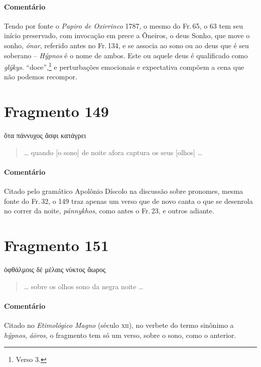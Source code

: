 \medskip

{\paragraph{Comentário} Tendo por fonte o \textit{Papiro de Oxirrinco} 1787, o mesmo do Fr.\,65, o 63 tem seu início preservado, com invocação em prece a Ôneiros, o deus Sonho, que move o sonho, \textit{ónar}, referido antes no Fr.\,134, e se associa ao sono ou ao deus que é seu soberano -- \textit{Hýpnos} é o nome de ambos. Este ou aquele deus é qualificado como \textit{glýkys}. ``doce'',\footnote{Verso 3.} e perturbações emocionais e expectativa compõem a cena que não podemos recompor.}



\pagebreak
\section{Fragmento 149}

\begin{gkverse}
ὄτα πάννυχος ἄσφι κατάγρει
\end{gkverse}

\begin{verse}
\ldots{} quando [o sono] de noite afora captura os seus [olhos] \ldots{}
\end{verse}

\medskip

{\paragraph{Comentário} Citado pelo gramático Apolônio Díscolo na discussão sobre pronomes, mesma fonte do Fr.\,32, o 149 traz apenas um verso que de novo canta o que se desenrola no correr da noite, \textit{pánnykhos}, como antes o Fr.\,23, e outros adiante.}


\section{Fragmento 151}

\begin{gkverse}
ὀφθάλμοις δὲ μέλαις νύκτος ἄωρος
\end{gkverse}

\begin{verse}
\ldots{} sobre os olhos sono da negra noite \ldots{}
\end{verse}

\medskip

 {\paragraph{Comentário} Citado no \textit{Etimológico Magno} (século \textsc{xii}), no verbete do termo sinônimo a \textit{hýpnos}, \textit{áōros}, o fragmento tem só um verso, sobre o sono, como o anterior.}

